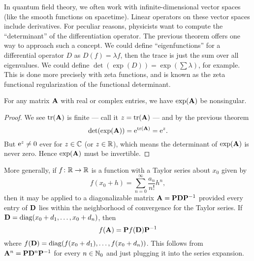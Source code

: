 \begin{remark}
In quantum field theory, we often work with infinite-dimensional vector
spaces (like the smooth functions on spacetime). Linear operators on
these vector spaces include derivatives. For peculiar reasons,
physicists want to compute the ``determinant'' of the differentiation
operator. The previous theorem offers one way to approach such a
concept. We could define ``eigenfunctions'' for a differential operator
$D$ as $D(f)=\lambda f$, then the trace is just the sum over all eigenvalues.
We could define $\det(\exp(D))=\exp(\sum\lambda)$, for example. This is
done more precisely with zeta functions, and is known as the zeta
functional regularization of the functional determinant.
\end{remark}

\begin{corollary}
  For any matrix $\mathbf{A}$ with real or complex entries,
  we have $\exp(\mathbf{A})$ be nonsingular.
\end{corollary}

\begin{proof}
We see $\mathop{\rm tr}\nolimits(\mathbf{A})$ is finite --- call it $z=\mathop{\rm tr}\nolimits(\mathbf{A})$ --- and
by the previous theorem
\begin{equation}
\det(\exp(\mathbf{A})) = \mathrm{e}^{\mathop{\rm tr}\nolimits(\mathbf{A})} = \mathrm{e}^{z}.
\end{equation}
But $\mathrm{e}^{z}\neq0$ ever for $z\in\mathbb{C}$ (or $z\in\mathbb{R}$), which means the
determinant of $\exp(\mathbf{A})$ is never zero. Hence $\exp(\mathbf{A})$ must
be invertible.
\end{proof}

More generally, if $f\colon\mathbb{R}\to\mathbb{R}$ is a function with a Taylor series about $x_{0}$
given by
\begin{equation}
f(x_{0}+h)=\sum^{\infty}_{n=0}\frac{a_{n}}{n!}h^{n},
\end{equation}
then it may be applied to a diagonalizable matrix
$\mathbf{A}=\mathbf{P}\mathbf{D}\mathbf{P}^{-1}$ provided every entry of $\mathbf{D}$
lies within the neighborhood of convergence for the Taylor series. If
$\mathbf{D} = \operatorname{diag}(x_{0} + d_{1}, \dots, x_{0} + d_{n})$, then
\begin{equation}
f(\mathbf{A}) = \mathbf{P}f(\mathbf{D})\mathbf{P}^{-1}
\end{equation}
where $f(\mathbf{D}) = \operatorname{diag}(f(x_{0} + d_{1}), \dots, f(x_{0}+d_{n}))$.
This follows from $\mathbf{A}^{n}=\mathbf{P}\mathbf{D}^{n}\mathbf{P}^{-1}$ for every
$n\in\mathbb{N}_{0}$ and just plugging it into the series expansion.
